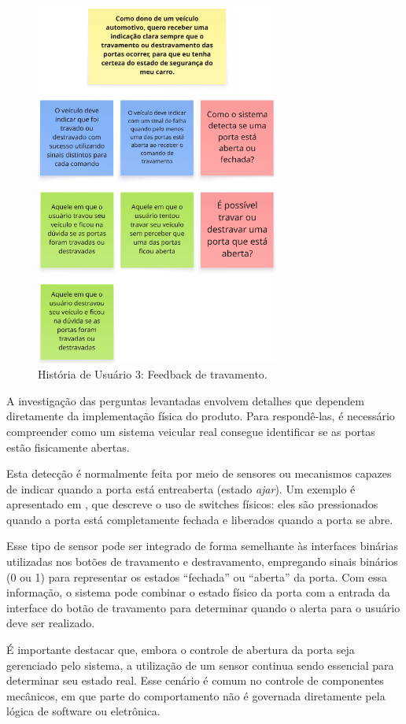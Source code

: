 \begin{figure}[H]
\centering
\includegraphics[height=12cm]{figuras/user_story_3.png}
\caption{História de Usuário 3: Feedback de travamento.}
\label{fig:historia3}
\end{figure}

A investigação das perguntas levantadas envolvem detalhes que dependem diretamente da implementação física do produto. Para respondê-las, é necessário 
compreender como um sistema veicular real consegue identificar se as portas estão fisicamente abertas.

Esta detecção é normalmente feita por meio de sensores ou mecanismos capazes de indicar quando a porta está entreaberta (estado \textit{ajar}). Um exemplo é 
apresentado em , que descreve o uso de switches físicos: eles são pressionados quando a porta está completamente fechada e liberados 
quando a porta se abre. 

Esse tipo de sensor pode ser integrado de forma semelhante às interfaces binárias utilizadas nos botões de travamento e destravamento, empregando sinais 
binários (0 ou 1) para representar os estados ``fechada'' ou ``aberta'' da porta. Com essa informação, o sistema pode combinar o estado físico da porta com a 
entrada da interface do botão de travamento para determinar quando o alerta para o usuário deve ser realizado.

É importante destacar que, embora o controle de abertura da porta seja gerenciado pelo sistema, a utilização de um sensor continua sendo essencial para 
determinar seu estado real. Esse cenário é comum no controle de componentes mecânicos, em que parte do comportamento não é governada diretamente pela 
lógica de software ou eletrônica.

